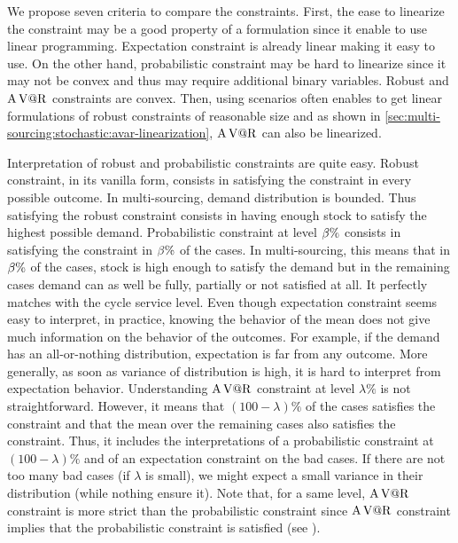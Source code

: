 We propose seven criteria to compare the constraints.
First, the ease to linearize the constraint may be a good property of a formulation since it enable to use linear programming.
Expectation constraint is already linear making it easy to use.
On the other hand, probabilistic constraint may be hard to linearize since it may not be convex and thus may require additional binary variables.
Robust and $\operatorname{A\operatorname{V@R}}$ constraints are convex.
Then, using scenarios often enables to get linear formulations of robust constraints of reasonable size and as shown in \cref{sec:multi-sourcing:stochastic:avar-linearization}, $\operatorname{A\operatorname{V@R}}$ can also be linearized.


Interpretation of robust and probabilistic constraints are quite easy.
Robust constraint, in its vanilla form, consists in satisfying the constraint in every possible outcome.
In multi-sourcing, demand distribution is bounded.
Thus satisfying the robust constraint consists in having enough stock to satisfy the highest possible demand.
Probabilistic constraint at level $\beta\%$ consists in satisfying the constraint in $\beta\%$ of the cases.
In multi-sourcing, this means that in $\beta\%$ of the cases, stock is high enough to satisfy the demand but in the remaining cases demand can as well be fully, partially or not satisfied at all.
It perfectly matches with the cycle service level.
Even though expectation constraint seems easy to interpret, in practice, knowing the behavior of the mean does not give much information on the behavior of the outcomes.
For example, if the demand has an all-or-nothing distribution, expectation is far from any outcome.
More generally, as soon as variance of distribution is high, it is hard to interpret from expectation behavior.
Understanding $\operatorname{A\operatorname{V@R}}$ constraint at level $\lambda\%$ is not straightforward.
However, it means that $(100-\lambda)\%$ of the cases satisfies the constraint and that the mean over the remaining cases also satisfies the constraint.
Thus, it includes the interpretations of a probabilistic constraint at $(100-\lambda)\%$ and of an expectation constraint on the bad cases.
If there are not too many bad cases (\ie if $\lambda$ is small), we might expect a small variance in their distribution (while nothing ensure it).
Note that, for a same level, $\operatorname{A\operatorname{V@R}}$ constraint is more strict than the probabilistic constraint since $\operatorname{A\operatorname{V@R}}$ constraint implies that the probabilistic constraint is satisfied (see \citet{Rockafellar2000,Rockafellar2002}).


